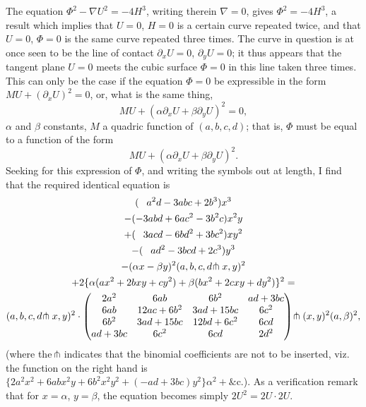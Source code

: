 \documentclass[11pt,a4paper]{article}
\begin{document}
The equation $\Phi^{2} - \nabla U^{2} = -4H^{3}$, writing therein $\nabla=0$, gives $\Phi^{2} = -4H^{3}$, a result which implies that $U=0$, $H=0$ is a certain curve repeated twice, and that $U=0$, $\Phi=0$ is the same curve repeated three times. The curve in question is at once seen to be the line of contact $\partial_{x}U=0$, $\partial_{y}U=0$; it thus appears that the tangent plane $U=0$ meets the cubic surface $\Phi=0$ in this line taken three times. This can only be the case if the equation $\Phi=0$ be expressible in the form $MU + (\partial_{x}U)^{2} = 0$, or, what is the same thing,
\[
MU + (\alpha\partial_{x}U + \beta\partial_{y}U)^{2} = 0,
\]
$\alpha$ and $\beta$ constants, $M$ a quadric function of $(a, b, c, d)$; that is, $\Phi$ must be equal to a function of the form
\[
MU + (\alpha\partial_{x}U + \beta\partial_{y}U)^{2}.
\]
Seeking for this expression of $\Phi$, and writing the symbols out at length, I find that the required identical equation is
\begin{multline*}
(\phantom{-}a^{2}d - 3abc + 2b^{3})x^{3}\\
- (-3abd + 6ac^{2} - 3b^{2}c)x^{2}y\\
+ (\phantom{-}3acd - 6bd^{2} + 3bc^{2})xy^{2}\\
- (\phantom{-}ad^{2} - 3bcd + 2c^{3})y^{3}\\
- (\alpha x - \beta y)^{2}(a,b,c,d\hspace{-0.2em}\pitchfork x,y)^{2}\\
+ 2\{\alpha(ax^{2}+2bxy+cy^{2}) + \beta(bx^{2}+2cxy+dy^{2})\}^{2} =\\
(a,b,c,d\hspace{-0.2em}\pitchfork x,y)^{2} \cdot
\begin{pmatrix}
2a^{2} & 6ab & 6b^{2} & ad+3bc\\
6ab & 12ac+6b^{2} & 3ad+15bc & 6c^{2}\\
6b^{2} & 3ad+15bc & 12bd+6c^{2} & 6cd\\
ad+3bc & 6c^{2} & 6cd & 2d^{2}
\end{pmatrix}
\hspace{-0.2em}\pitchfork (x,y)^{2}(a,\beta)^{2},
\end{multline*}
(where the $\hspace{-0.2em}\pitchfork$ indicates that the binomial coefficients are not to be inserted, viz. the function on the right hand is $\{2a^{2}x^{2} + 6abx^{2}y + 6b^{2}x^{2}y^{2} + (-ad+3bc)y^{2}\}\alpha^{2} + \&\text{c.}$). As a verification remark that for $x=\alpha$, $y=\beta$, the equation becomes simply $2U^{2} = 2U \cdot 2U$.
\end{document}
